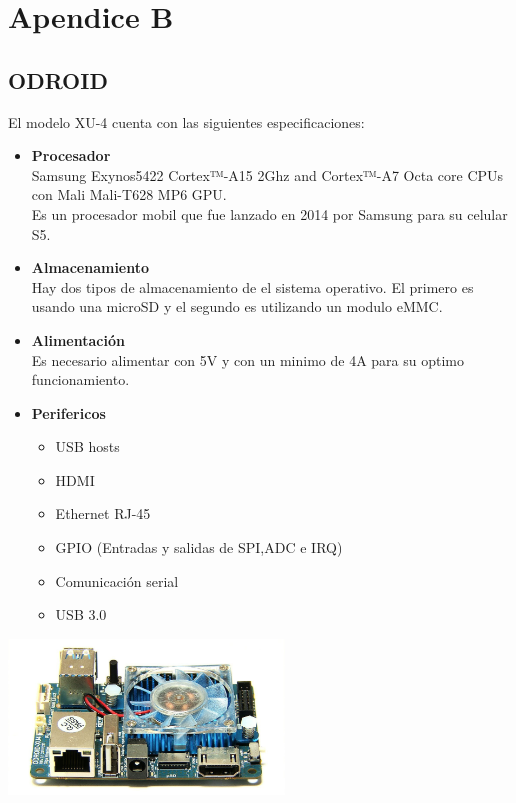 \chapter{Apendice B}
\section{ODROID}
El modelo XU-4 cuenta con las siguientes especificaciones:~\cite{hardkernel2017}
\begin{itemize}
    \item \textbf{Procesador}\\
    Samsung Exynos5422 Cortex™-A15 2Ghz and Cortex™-A7 Octa
    core CPUs con Mali Mali-T628 MP6 GPU.\\
    Es un procesador mobil que fue lanzado en 2014 por Samsung para su celular S5.
    \item \textbf{Almacenamiento}\\
    Hay dos tipos de almacenamiento de el sistema operativo. El primero es usando
    una microSD y el segundo es utilizando un modulo eMMC.
    \item \textbf{Alimentación}\\
    Es necesario alimentar con 5V y con un minimo de 4A para su optimo funcionamiento.
    \item \textbf{Perifericos}
    \begin{itemize}
        \item USB hosts
        \item HDMI
        \item Ethernet RJ-45
        \item GPIO (Entradas y salidas de SPI,ADC e IRQ)
        \item Comunicación serial
        \item USB 3.0
    \end{itemize}
    
\end{itemize}
\begin{center}
    \includegraphics[width=0.55\textwidth]{ApendiceB/Fig0.eps}
    \label{Fig5}
\end{center}
